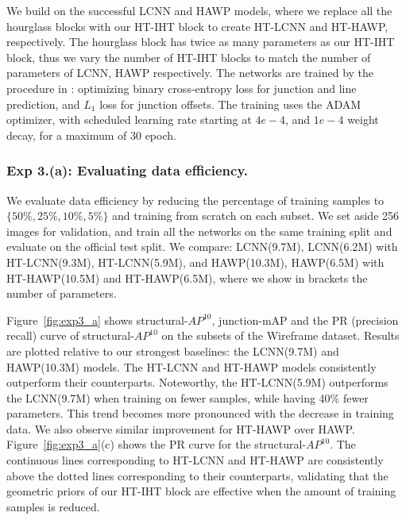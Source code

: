 \documentclass[runningheads]{llncs}
\newcommand{\model}{HT-IHT block\xspace}
\begin{document}
We build on the successful LCNN \cite{zhou2019end} and HAWP \cite{xue2020holistically} models, where we replace all the hourglass blocks with our \model to create HT-LCNN and HT-HAWP, respectively. 
The hourglass block has twice as many parameters as our \model, thus we vary the number of HT-IHT blocks to match the number of parameters of LCNN, HAWP respectively. 
The networks are trained by the procedure in \cite{xue2020holistically,zhou2019learning}: optimizing binary cross-entropy loss for junction and line prediction, and $L_1$ loss for junction offsets.
The training uses the ADAM optimizer, with scheduled learning rate starting at $4e-4$, and $1e-4$ weight decay, for a maximum of 30 epoch.

\subsubsection{\textbf{Exp 3.(a):} Evaluating data efficiency.}
\label{Exp 3.(a)}

We evaluate data efficiency by reducing the percentage of training samples to $\{ 50\%, 25\%, 10\%, 5\%\}$  and training from scratch on each subset.  
We set aside 256 images for validation, and train all the networks on the same training split and evaluate on the official test split. 
We compare: LCNN(9.7M), LCNN(6.2M) with HT-LCNN(9.3M), HT-LCNN(5.9M), and HAWP(10.3M), HAWP(6.5M) with HT-HAWP(10.5M) and HT-HAWP(6.5M), where we show in brackets the number of parameters.

Figure~\ref{fig:exp3_a} shows structural-$AP^{10}$, junction-mAP and the PR (precision recall) curve of structural-$AP^{10}$ on the subsets of the Wireframe dataset.
Results are plotted relative to our strongest baselines: the LCNN(9.7M) and HAWP(10.3M) models.   
The HT-LCNN and HT-HAWP models consistently outperform their counterparts.
Noteworthy, the HT-LCNN(5.9M) outperforms the LCNN(9.7M) when training on fewer samples, while having 40\% fewer parameters.
This trend becomes more pronounced with the decrease in training data. 
We also observe similar improvement for HT-HAWP over HAWP.
Figure~\ref{fig:exp3_a}(c) shows the PR curve for the structural-$AP^{10}$. 
The continuous lines corresponding to HT-LCNN and HT-HAWP are consistently above the dotted lines corresponding to their counterparts, validating that the geometric priors of our \model are effective when the amount of training samples is reduced.
\end{document}
